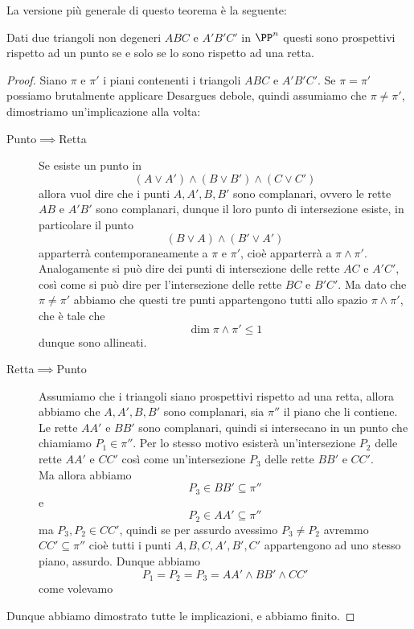 \documentclass[11pt]{scrartcl}
\begin{document}
   	 La versione più generale di questo teorema è la seguente:
   	 \begin{theorem}
   	 	Dati due triangoli non degeneri $ABC$ e $A'B'C'$ in $\PP^n$ questi sono prospettivi rispetto ad un punto se e solo se lo sono rispetto ad una retta.
   	 \end{theorem}
   	 \begin{proof}
   	 	Siano $\pi$ e $\pi'$ i piani contenenti i triangoli $ABC$ e $A'B'C'$. Se $\pi=\pi'$ possiamo brutalmente applicare Desargues debole, quindi assumiamo che $\pi\ne \pi'$, dimostriamo un'implicazione alla volta:
   	 	\begin{description}
   	 		\item[Punto$\implies$Retta] Se esiste un punto in 
   	 		$$\left(A\lor A'\right)\land \left(B\lor B'\right)\land \left(C\lor C'\right)$$
   	 		allora vuol dire che i punti $A,A',B,B'$ sono complanari, ovvero le rette $AB$ e $A'B'$ sono complanari, dunque il loro punto di intersezione esiste, in particolare il punto
   	 		$$\left(B\lor A\right)\land \left(B'\lor A'\right)$$
   	 		apparterrà contemporaneamente a $\pi$ e $\pi'$, cioè apparterrà a $\pi\land \pi'$. Analogamente si può dire dei punti di intersezione delle rette $AC$ e $A'C'$, così come si può dire per l'intersezione delle rette $BC$ e $B'C'$. Ma dato che $\pi\ne\pi'$ abbiamo che questi tre punti appartengono tutti allo spazio $\pi\land \pi'$, che è tale che
   	 		$$\dim \pi\land \pi'\le 1$$
   	 		dunque sono allineati.
   	 		\item[Retta$\implies$Punto] Assumiamo che i triangoli siano prospettivi rispetto ad una retta, allora abbiamo che $A,A',B,B'$ sono complanari, sia $\pi''$ il piano che li contiene. Le rette $AA'$ e $BB'$ sono complanari, quindi si intersecano in un punto che chiamiamo $P_1\in\pi''$. Per lo stesso motivo esisterà un'intersezione $P_2$ delle rette $AA'$ e $CC'$ così come un'intersezione $P_3$ delle rette $BB'$ e $CC'$. \\
   	 		Ma allora abbiamo
   	 		$$P_3\in BB'\subseteq \pi''$$
   	 		e
   	 		$$P_2\in AA'\subseteq \pi''$$ 
   	 		ma $P_3,P_2\in CC'$, quindi se per assurdo avessimo $P_3\ne P_2$ avremmo $CC'\subseteq \pi''$ cioè tutti i punti $A,B,C,A',B',C'$ appartengono ad uno stesso piano, assurdo. Dunque abbiamo 
   	 		$$P_1=P_2=P_3=AA'\land BB'\land CC'$$
   	 		come volevamo
   	 	\end{description}
   	 	Dunque abbiamo dimostrato tutte le implicazioni, e abbiamo finito.
   	 \end{proof}
\end{document}

